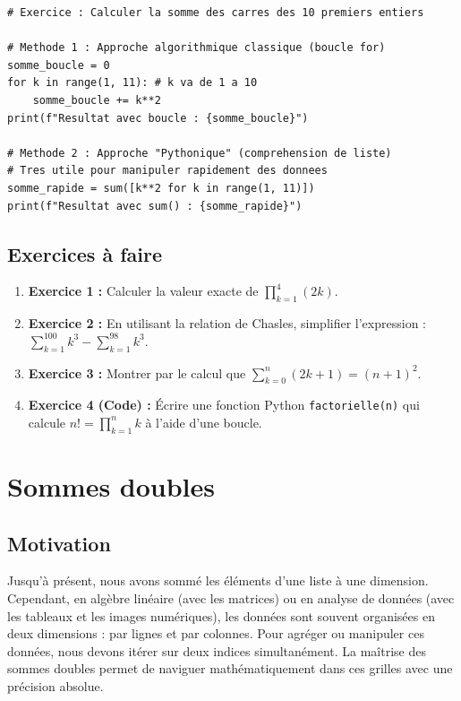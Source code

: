 \documentclass[12pt,a4paper]{report}
\begin{document}
\begin{lstlisting}
# Exercice : Calculer la somme des carres des 10 premiers entiers

# Methode 1 : Approche algorithmique classique (boucle for)
somme_boucle = 0
for k in range(1, 11): # k va de 1 a 10
    somme_boucle += k**2
print(f"Resultat avec boucle : {somme_boucle}")

# Methode 2 : Approche "Pythonique" (comprehension de liste)
# Tres utile pour manipuler rapidement des donnees
somme_rapide = sum([k**2 for k in range(1, 11)])
print(f"Resultat avec sum() : {somme_rapide}")
\end{lstlisting}

\subsection{Exercices à faire}
\begin{enumerate}
    \item \textbf{Exercice 1 :} Calculer la valeur exacte de $\prod_{k=1}^{4} (2k)$.
    \item \textbf{Exercice 2 :} En utilisant la relation de Chasles, simplifier l'expression : $\sum_{k=1}^{100} k^3 - \sum_{k=1}^{98} k^3$.
    \item \textbf{Exercice 3 :} Montrer par le calcul que $\sum_{k=0}^{n} (2k+1) = (n+1)^2$.
    \item \textbf{Exercice 4 (Code) :} Écrire une fonction Python \texttt{factorielle(n)} qui calcule $n! = \prod_{k=1}^{n} k$ à l'aide d'une boucle.
\end{enumerate}

\section{Sommes doubles}

\subsection{Motivation}
Jusqu'à présent, nous avons sommé les éléments d'une liste à une dimension. Cependant, en algèbre linéaire (avec les matrices) ou en analyse de données (avec les tableaux et les images numériques), les données sont souvent organisées en deux dimensions : par lignes et par colonnes. Pour agréger ou manipuler ces données, nous devons itérer sur deux indices simultanément. La maîtrise des sommes doubles permet de naviguer mathématiquement dans ces grilles avec une précision absolue.
\end{document}

